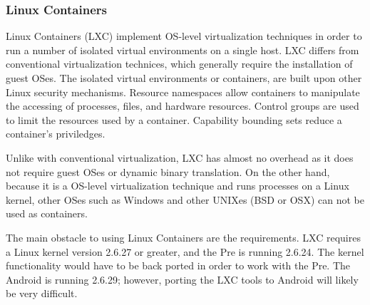 \subsubsection{Linux Containers}
Linux Containers (LXC) implement OS-level virtualization techniques in order to run a number of isolated virtual environments on a single host.  LXC differs from conventional virtualization technices, which generally require the installation of guest OSes.  The isolated virtual environments or containers, are built upon other Linux security mechanisms.  Resource namespaces allow containers to manipulate the accessing of processes, files, and hardware resources.  Control groups are used to limit the resources used by a container.  Capability bounding sets reduce a container's priviledges.  

Unlike with conventional virtualization, LXC has almost no overhead as it does not require guest OSes or dynamic binary translation.  On the other hand, because it is a OS-level virtualization technique and runs processes on a Linux kernel, other OSes such as Windows and other UNIXes (BSD or OSX) can not be used as containers.  

The main obstacle to using Linux Containers are the requirements.  LXC requires a Linux kernel version 2.6.27 or greater, and the Pre is running 2.6.24.  The kernel functionality would have to be back ported in order to work with the Pre.  The Android is running 2.6.29; however, porting the LXC tools to Android will likely be very difficult.
